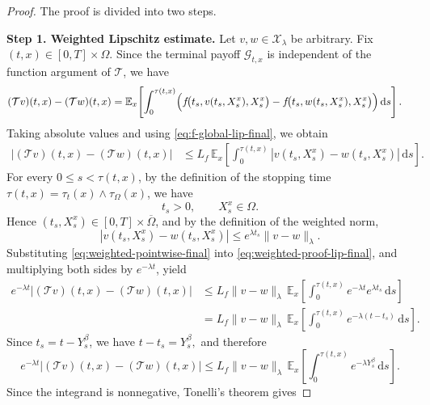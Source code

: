 \documentclass[10pt,a4paper]{amsart}
\begin{document}
\begin{proof}
The proof is divided into two steps.

\medskip
\noindent
\textbf{Step 1. Weighted Lipschitz estimate.}
Let $v,w\in\mathcal{X}_\lambda$ be arbitrary. Fix $(t,x)\in[0,T]\times\Omega$. Since the terminal payoff $\mathcal{G}_{t,x}$ is independent of the function argument of $\mathcal{T}$, we have
\begin{align}
(\mathcal{T}v)(t,x)-(\mathcal{T}w)(t,x)
&=
\mathbb{E}_x\!\left[
\int_0^{\tau(t,x)}
\Bigl(
f\!\bigl(t_s,v(t_s,X_s^x),X_s^x\bigr)
-
f\!\bigl(t_s,w(t_s,X_s^x),X_s^x\bigr)
\Bigr)\,\mathrm{d}s
\right].
\label{eq:weighted-proof-diff-final}
\end{align}
Taking absolute values and using \eqref{eq:f-global-lip-final}, we obtain
\begin{align}
|(\mathcal{T}v)(t,x)-(\mathcal{T}w)(t,x)|
&\le
L_f\,
\mathbb{E}_x\!\left[
\int_0^{\tau(t,x)}
|v(t_s,X_s^x)-w(t_s,X_s^x)|
\,\mathrm{d}s
\right].
\label{eq:weighted-proof-lip-final}
\end{align}
For every $0\le s<\tau(t,x)$, by the definition of the stopping time $\tau(t,x)=\tau_t(x)\wedge \tau_\Omega(x)$, we have
\[
t_s>0,
\qquad
X_s^x\in\Omega.
\]
Hence $(t_s,X_s^x)\in[0,T]\times\overline{\Omega}$, and by the definition of the weighted norm,
\begin{equation}\label{eq:weighted-pointwise-final}
|v(t_s,X_s^x)-w(t_s,X_s^x)|
\le
e^{\lambda t_s}\|v-w\|_\lambda .
\end{equation}
Substituting \eqref{eq:weighted-pointwise-final} into \eqref{eq:weighted-proof-lip-final}, and multiplying both sides by $e^{-\lambda t}$, yield
\begin{align}
e^{-\lambda t}|(\mathcal{T}v)(t,x)-(\mathcal{T}w)(t,x)|
&\le
L_f\|v-w\|_\lambda\,
\mathbb{E}_x\!\left[
\int_0^{\tau(t,x)}
e^{-\lambda t}e^{\lambda t_s}\,\mathrm{d}s
\right]
\nonumber\\
&=
L_f\|v-w\|_\lambda\,
\mathbb{E}_x\!\left[
\int_0^{\tau(t,x)}
e^{-\lambda(t-t_s)}\,\mathrm{d}s
\right].
\label{eq:weighted-proof-after-weight-final}
\end{align}
Since $t_s=t-Y_s^\beta$, we have
\(
t-t_s=Y_s^\beta,
\)
and therefore
\begin{equation}\label{eq:weighted-proof-before-tonelli-final}
e^{-\lambda t}|(\mathcal{T}v)(t,x)-(\mathcal{T}w)(t,x)|
\le
L_f\|v-w\|_\lambda\,
\mathbb{E}_x\!\left[
\int_0^{\tau(t,x)}
e^{-\lambda Y_s^\beta}\,\mathrm{d}s
\right].
\end{equation}
Since the integrand is nonnegative, Tonelli's theorem gives

\end{proof}
\end{document}
